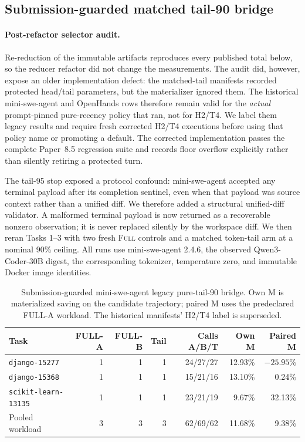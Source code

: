 \documentclass[11pt]{article}
\begin{document}
\subsection{Submission-guarded matched tail-90 bridge}

\paragraph{Post-refactor selector audit.}
Re-reduction of the immutable artifacts reproduces every published total
below, so the reducer refactor did not change the measurements.  The audit did,
however, expose an older implementation defect: the matched-tail manifests
recorded protected head/tail parameters, but the materializer ignored them.
The historical mini-swe-agent and OpenHands rows therefore remain valid for the
\emph{actual} prompt-pinned pure-recency policy that ran, not for H2/T4.  We
label them legacy results and require fresh corrected H2/T4 executions before
using that policy name or promoting a default.  The corrected implementation
passes the complete Paper~8.5 regression suite and records floor overflow
explicitly rather than silently retiring a protected turn.

The tail-95 stop exposed a protocol confound: mini-swe-agent accepted any
terminal payload after its completion sentinel, even when that payload was
source context rather than a unified diff. We therefore added a structural
unified-diff validator. A malformed terminal payload is now returned as a
recoverable nonzero observation; it is never replaced silently by the
workspace diff. We then reran Tasks 1--3 with two fresh \textsc{Full}
controls and a matched token-tail arm at a nominal 90\% ceiling. All runs use
mini-swe-agent 2.4.6, the observed Qwen3-Coder-30B digest, the corresponding
tokenizer, temperature zero, and immutable Docker image identities.

\begin{table}[H]
\centering
\scriptsize
\caption{Submission-guarded mini-swe-agent legacy pure-tail-90 bridge. Own M
is materialized saving on the candidate trajectory; paired M uses the predeclared
FULL-A workload. The historical manifests' H2/T4 label is superseded.}
\label{tab:mini-guarded-tail90}
\begin{tabular}{lrrrrrr}
\toprule
Task & FULL-A & FULL-B & Tail & Calls A/B/T & Own M & Paired M \\
\midrule
\texttt{django-15277} & 1 & 1 & 1 & 24/27/27 & 12.93\% & $-25.95$\% \\
\texttt{django-15368} & 1 & 1 & 1 & 15/21/16 & 13.10\% & 0.24\% \\
\texttt{scikit-learn-13135} & 1 & 1 & 1 & 23/21/19 & 9.67\% & 32.13\% \\
\midrule
Pooled workload & 3 & 3 & 3 & 62/69/62 & 11.68\% & 9.38\% \\
\bottomrule
\end{tabular}
\end{table}
\end{document}
